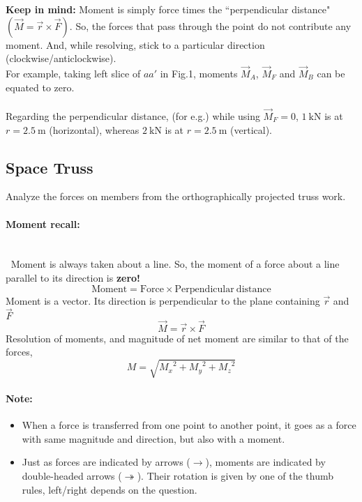 \documentclass{article}
\newcommand{\para}[1]{\paragraph{#1}\mbox{}\\}
\begin{document}
{\begin{enumerate}[(a)]
\textbf{\Large Keep in mind:} Moment is simply force times the ``perpendicular distance" $(\vec M=\vec r\times \vec F)$. So, the forces that pass through the point do not contribute any moment. And, while resolving, stick to a particular direction (clockwise/anticlockwise).
\\

For example, taking left slice of $aa'$ in Fig.1, moments $\vec M_A$, $\vec M_F$ and $\vec M_B$ can be equated to zero.
\\
\\
Regarding the perpendicular distance, (for e.g.) while using $\vec M_F=0$, $\mathrm{1\ kN}$ is at $r=\mathrm{2.5\ m}$ (horizontal), whereas $\mathrm{2\ kN}$ is at $r=\mathrm{2.5\ m}$ (vertical).
\end{enumerate}
\newpage
\subsection{\LARGE Space Truss}
Analyze the forces on members from the orthographically projected truss work.
\para{\Large Moment recall:}
$\ $
Moment is always taken about a line. So, the moment of a force about a line parallel to its direction is \textbf{zero!}
$$\mathrm{Moment=Force\times Perpendicular\ distance}$$
Moment is a vector. Its direction is perpendicular to the plane containing $\vec r$ and $\vec F$
{\LARGE $$\vec M=\vec r \times \vec F$$}
Resolution of moments, and magnitude of net moment are similar to that of the forces,
{\LARGE $$M=\sqrt{{M_x}^2+{M_y}^2+{M_z}^2}$$}
\paragraph{\Large Note:}
\begin{itemize}
\item When a force is transferred from one point to another point, it goes as a force with same magnitude and direction, but also with a moment.
\item Just as forces are indicated by arrows ($\rightarrow $), moments are indicated by double-headed arrows ({\huge $\twoheadrightarrow $}). Their rotation is given by one of the thumb rules, left/right depends on the question.
\end{itemize}
\newpage
}
\end{document}

